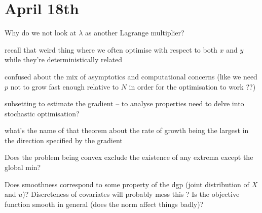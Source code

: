 \documentclass[a4paper,12pt,twoside]{article}
\begin{document}
\section*{April 18th}

Why do we not look at $\lambda$ as another Lagrange multiplier?

recall that weird thing where we often optimise with respect to both $x$ and $y$ while they're deterministically related

confused about the mix of asymptotics and computational concerns (like we need $p$ not to grow fast enough relative to $N$ in order for the optimisation to work ??)


subsetting to estimate the gradient -- to analyse properties need to delve into stochastic optimisation?

what's the name of that theorem about the rate of growth being the largest in the direction specified by the gradient

Does the problem being convex exclude the existence of any extrema except the global min?


Does smoothness correspond to some property of the dgp (joint distribution of $X$ and $u$)? Discreteness of covariates will probably mess this ?
Is the objective function smooth in general (does the norm affect things badly)?
\end{document}
